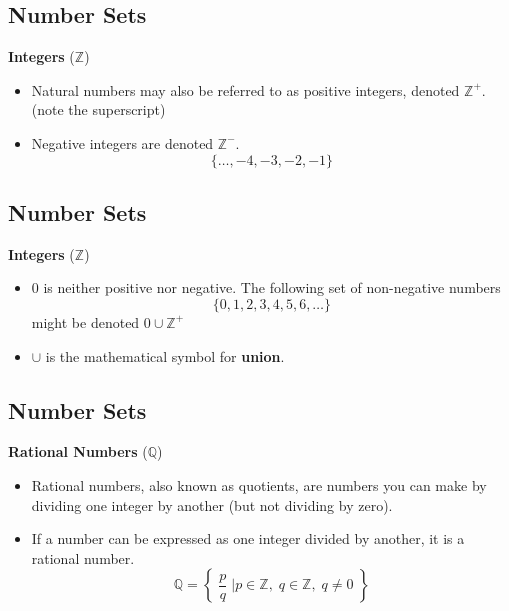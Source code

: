 \documentclass[]{report}
\begin{document}
 
  
  \subsection{Number Sets}
    
  \textbf{Integers} ($\mathbb{Z}$)
  \begin{itemize}
 \item Natural numbers may also be referred to as positive integers, denoted $\mathbb{Z}^{+}$. \\(note the superscript)
 \item Negative integers are denoted $\mathbb{Z}^{-}$.
 \[\{\ldots,-4,-3,-2,-1\}\]
  \end{itemize}
   
  
   
   \subsection{Number Sets}
     
   \textbf{Integers} ($\mathbb{Z}$)
   \begin{itemize}
 \item 0 is neither positive nor negative. The following set of non-negative numbers \[\{0,1,2,3,4,5,6,\ldots\} \] might be denoted $0 \cup \mathbb{Z}^{+}$
 \item $\cup$ is the mathematical symbol for \textbf{union}.
 \end{itemize}
  


\subsection{Number Sets}

\textbf{Rational Numbers} ($\mathbb{Q}$)
\begin{itemize}
\item Rational numbers, also known as quotients, are numbers you can make by dividing one integer by another (but not dividing by zero). 
\item If a number can be expressed as one integer divided by another, it is a rational number.
\[ \mathbb{Q} = \left\{\; \frac{p}{q} \;\bigg| p \in \mathbb{Z},\; q \in \mathbb{Z},\; q \neq 0  \;   \right\}   \]
\end{itemize}
\end{document}
